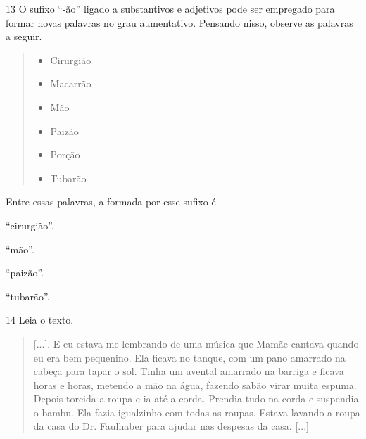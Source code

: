 \num{13} O sufixo ``-ão'' ligado a substantivos e adjetivos pode ser
empregado para formar novas palavras no grau aumentativo. Pensando
nisso, observe as palavras a seguir.

\begin{quote}
\begin{itemize}
\item Cirurgião

\item Macarrão

\item Mão

\item Paizão

\item Porção

\item Tubarão
\end{itemize}
\end{quote}

Entre essas palavras, a formada por esse sufixo é

\begin{escolha}
\item ``cirurgião''.

\item ``mão''.

\item ``paizão''.

\item ``tubarão''.
\end{escolha}


\num{14} Leia o texto.

\begin{quote}
{[}...{]}. E eu estava me lembrando de uma música que Mamãe cantava
quando eu era bem pequenino. Ela ficava no tanque, com um pano amarrado
na cabeça para tapar o sol. Tinha um avental amarrado na barriga e
ficava horas e horas, metendo a mão na água, fazendo sabão virar muita
espuma. Depois torcida a roupa e ia até a corda. Prendia tudo na corda e
suspendia o bambu. Ela fazia igualzinho com todas as roupas. Estava
lavando a roupa da casa do Dr. Faulhaber para ajudar nas despesas da
casa. {[}...{]}

\end{quote}

